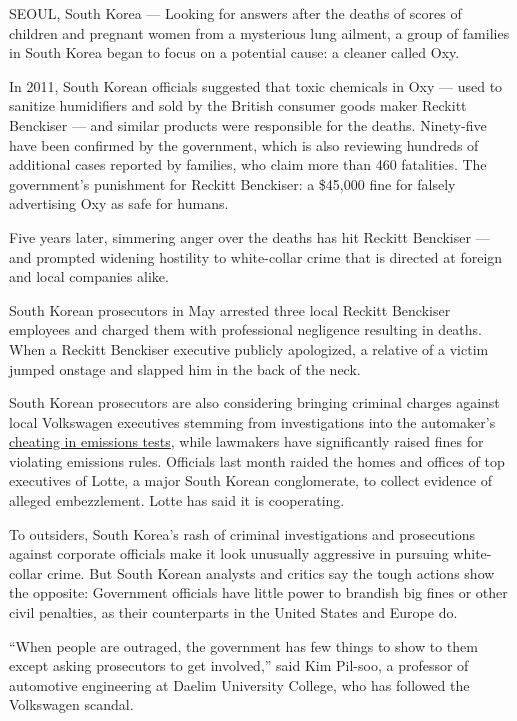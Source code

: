 SEOUL, South Korea --- Looking for answers after the deaths of scores of
children and pregnant women from a mysterious lung ailment, a group of
families in South Korea began to focus on a potential cause: a cleaner
called Oxy.

In 2011, South Korean officials suggested that toxic chemicals in Oxy
--- used to sanitize humidifiers and sold by the British consumer goods
maker Reckitt Benckiser --- and similar products were responsible for
the deaths. Ninety-five have been confirmed by the government, which is
also reviewing hundreds of additional cases reported by families, who
claim more than 460 fatalities. The government's punishment for Reckitt
Benckiser: a \$45,000 fine for falsely advertising Oxy as safe for
humans.

Five years later, simmering anger over the deaths has hit Reckitt
Benckiser --- and prompted widening hostility to white-collar crime that
is directed at foreign and local companies alike.

South Korean prosecutors in May arrested three local Reckitt Benckiser
employees and charged them with professional negligence resulting in
deaths. When a Reckitt Benckiser executive publicly apologized, a
relative of a victim jumped onstage and slapped him in the back of the
neck.

South Korean prosecutors are also considering bringing criminal charges
against local Volkswagen executives stemming from investigations into
the automaker's
\href{https://www.nytimes.com/interactive/2015/business/international/vw-diesel-emissions-scandal-explained.html}{cheating
in emissions tests}, while lawmakers have significantly raised fines for
violating emissions rules. Officials last month raided the homes and
offices of top executives of Lotte, a major South Korean conglomerate,
to collect evidence of alleged embezzlement. Lotte has said it is
cooperating.

To outsiders, South Korea's rash of criminal investigations and
prosecutions against corporate officials make it look unusually
aggressive in pursuing white-collar crime. But South Korean analysts and
critics say the tough actions show the opposite: Government officials
have little power to brandish big fines or other civil penalties, as
their counterparts in the United States and Europe do.

``When people are outraged, the government has few things to show to
them except asking prosecutors to get involved,'' said Kim Pil-soo, a
professor of automotive engineering at Daelim University College, who
has followed the Volkswagen scandal.

